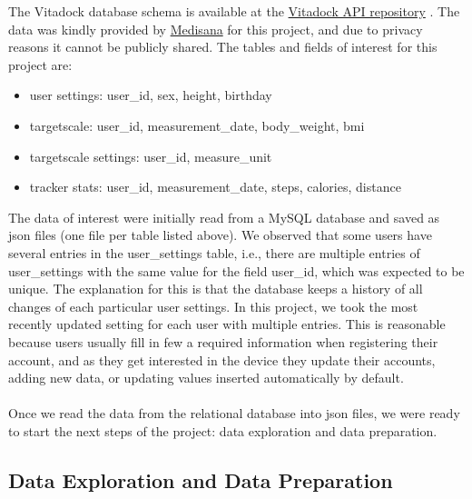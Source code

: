 \documentclass[12pt]{iopart}
\begin{document}
The  Vitadock database schema is available at the \href{https://github.com/Medisana/vitadock-api/wiki/DATA-MODEL-(all-modules)}{Vitadock API repository} .
The data was kindly provided by \href{http://www.medisana.de/}{Medisana\textregistered} for this project, and due to privacy reasons it cannot be publicly shared.
The tables and fields of interest for this project are: 
\begin{itemize}
\item user settings: user\_id, sex, height, birthday
\item targetscale: user\_id, measurement\_date, body\_weight, bmi
\item targetscale settings: user\_id, measure\_unit
\item tracker stats: user\_id, measurement\_date, steps, calories, distance
\end{itemize} 
The data of interest were initially read from a MySQL database and saved as json files (one file per table listed above).
We observed that some users have several entries in the user\_settings table, i.e., there are multiple entries of user\_settings with the same value for the field user\_id,
which was expected to be unique.
The explanation for this is that the database keeps a history of all changes of each particular user settings.
In this project, we took the most recently updated setting for each user with multiple entries. 
This is reasonable because users usually fill in few a required information when registering their account, and as they get interested in the device they update their accounts, adding new data, or updating values inserted automatically by default. 
\\ \\
Once we read the data from the relational database into json files, we were ready to start the next steps of the project: data exploration and data preparation.

\subsection{Data Exploration and Data Preparation}
\end{document}
